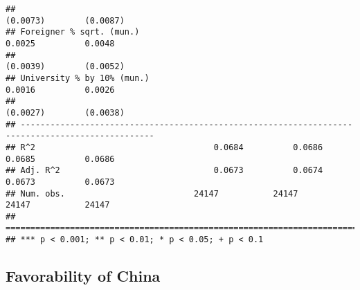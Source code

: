 \documentclass[
]{article}
\begin{document}
\begin{verbatim}
##                                                                       (0.0073)        (0.0087)   
## Foreigner % sqrt. (mun.)                                               0.0025          0.0048    
##                                                                       (0.0039)        (0.0052)   
## University % by 10% (mun.)                                             0.0016          0.0026    
##                                                                       (0.0027)        (0.0038)   
## -------------------------------------------------------------------------------------------------
## R^2                                    0.0684          0.0686          0.0685          0.0686    
## Adj. R^2                               0.0673          0.0674          0.0673          0.0673    
## Num. obs.                          24147           24147           24147           24147         
## =================================================================================================
## *** p < 0.001; ** p < 0.01; * p < 0.05; + p < 0.1
\end{verbatim}

\hypertarget{favorability-of-china}{%
\subsection{Favorability of China}\label{favorability-of-china}}
\end{document}
